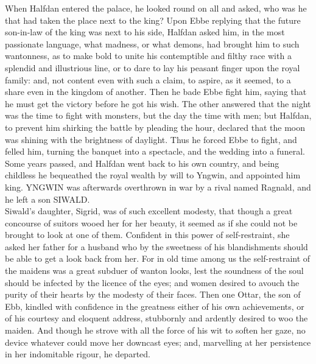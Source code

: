 \documentclass[10pt,a4paper]{report}
\begin{document}
When Halfdan entered the palace, he looked round on all and asked, who was he that had taken the place next to the king? Upon Ebbe replying that the future son-in-law of the king was next to his side, Halfdan asked him, in the most passionate language, what madness, or what demons, had brought him to such wantonness, as to make bold to unite his contemptible and filthy race with a splendid and illustrious line, or to dare to lay his peasant finger upon the royal family: and, not content even with such a claim, to aspire, as it seemed, to a share even in the kingdom of another. Then he bade Ebbe fight him, saying that he must get the victory before he got his wish. The other answered that the night was the time to fight with monsters, but the day the time with men; but Halfdan, to prevent him shirking the battle by pleading the hour, declared that the moon was shining with the brightness of daylight. Thus he forced Ebbe to fight, and felled him, turning the banquet into a spectacle, and the wedding into a funeral.\\

Some years passed, and Halfdan went back to his own country, and being childless he bequeathed the royal wealth by will to Yngwin, and appointed him king. YNGWIN was afterwards overthrown in war by a rival named Ragnald, and he left a son SIWALD.\\

Siwald's daughter, Sigrid, was of such excellent modesty, that though a great concourse of suitors wooed her for her beauty, it seemed as if she could not be brought to look at one of them. Confident in this power of self-restraint, she asked her father for a husband who by the sweetness of his blandishments should be able to get a look back from her. For in old time among us the self-restraint of the maidens was a great subduer of wanton looks, lest the soundness of the soul should be infected by the licence of the eyes; and women desired to avouch the purity of their hearts by the modesty of their faces. Then one Ottar, the son of Ebb, kindled with confidence in the greatness either of his own achievements, or of his courtesy and eloquent address, stubbornly and ardently desired to woo the maiden. And though he strove with all the force of his wit to soften her gaze, no device whatever could move her downcast eyes; and, marvelling at her persistence in her indomitable rigour, he departed.\\
\end{document}
